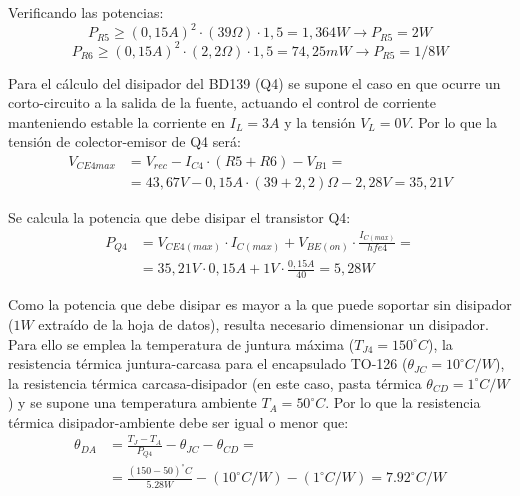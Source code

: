 Verificando las potencias:
\begin{equation}
P_{R5}\geq (0,15A)^2\cdot (39\Omega)\cdot 1,5=1,364 W \to P_{R5}=2W
\end{equation}
\begin{equation}
P_{R6}\geq (0,15A)^2\cdot (2,2\Omega)\cdot 1,5=74,25 mW \to P_{R5}=1/8W
\end{equation} \par

Para el cálculo del disipador del BD139 (Q4) se supone el caso en que ocurre un corto-circuito a la salida de la fuente, actuando el control de corriente manteniendo estable la corriente en $I_L=3A$ y la tensión $V_L=0V$. Por lo que la tensión de colector-emisor de Q4 será:
\begin{equation}
\begin{split}
V_{CE4max}&=V_{rec}-I_{C4}\cdot (R5+R6)-V_{B1}=\\
&=43,67V-0,15A\cdot (39+2,2)\Omega -2,28V=35,21 V
\end{split}
\end{equation} \par 

Se calcula la potencia que debe disipar el transistor Q4:
\begin{equation}
\begin{split}
P_{Q4}&=V_{CE4(max)}\cdot I_{C(max)}+V_{BE(on)}\cdot \frac{I_{C(max)}}{hfe4}=\\
&=35,21V\cdot 0,15A+1V\cdot \frac{0,15A}{40}=5,28W
\end{split}
\end{equation} \par 

Como la potencia que debe disipar es mayor a la que puede soportar sin disipador ($1 W$ extraído de la hoja de datos), resulta necesario dimensionar un disipador. Para ello se emplea la temperatura de juntura máxima ($T_{J4}=150^\circ C$), la resistencia térmica juntura-carcasa para el encapsulado TO-126 ($\theta _{JC}=10^\circ C/W$), la resistencia térmica carcasa-disipador (en este caso, pasta térmica $\theta _{CD}=1^\circ C/W$) y se supone una temperatura ambiente $T_A=50^\circ C$. Por lo que la resistencia térmica disipador-ambiente debe ser igual o menor que:
\begin{equation}
\begin{split}
\theta_{DA} &= \frac{T_J-T_A}{P_{Q4}}-\theta_{JC}-\theta_{CD}=\\
&= \frac{(150-50)^\circ C}{5.28W}-(10^\circ C/W)-(1^\circ C/W)=7.92^\circ C/W
\end{split}
\end{equation} \par
 
